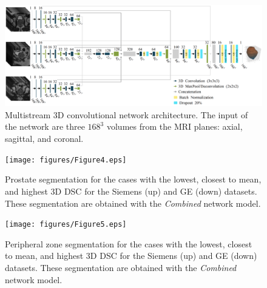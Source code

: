 \begin{figure}[ht]
    \centering
    \includegraphics[totalheight=.282\textheight]{figures/Figure3.eps}
    \caption{Multistream 3D convolutional network architecture. The input of the network are three $168^3$ volumes from the MRI planes: axial, sagittal, and coronal. }
    \label{fig:fig_3}
\end{figure}

\begin{figure}[ht]
    \centering
    \texttt{[image: figures/Figure4.eps]}
    \caption{Prostate segmentation for the cases with the lowest, closest to mean, and highest 3D DSC for the Siemens (up) and GE (down) datasets. These segmentation are obtained with the \emph{Combined} network model.  }
    \label{fig:resseg}
\end{figure} 

\begin{figure}[ht]
    \centering
    \texttt{[image: figures/Figure5.eps]}
    \caption{Peripheral zone segmentation for the cases with the lowest, closest to mean, and highest 3D DSC for the Siemens (up) and GE (down) datasets. These segmentation are obtained with the \emph{Combined} network model.  }
    \label{fig:ressegpz}
\end{figure} 
